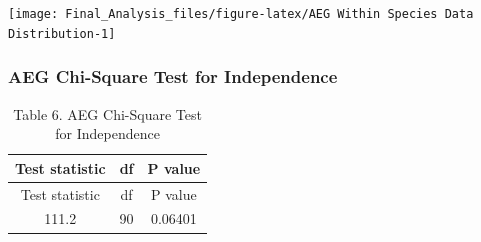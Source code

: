 \begin{center}\texttt{[image: Final\_Analysis\_files/figure-latex/AEG Within Species Data Distribution-1]} \end{center}

\subsubsection{AEG Chi-Square Test for
Independence}\label{aeg-chi-square-test-for-independence}

\begin{Shaded}
\begin{Highlighting}[]
\NormalTok{(} \NormalTok{, } \NormalTok{)}
\end{Highlighting}
\end{Shaded}

\begin{longtable}[]{@{}ccc@{}}
\caption{Table 6. AEG Chi-Square Test for Independence}\tabularnewline
\toprule
\begin{minipage}[b]{0.22\columnwidth}\centering\strut
Test statistic\strut
\end{minipage} & \begin{minipage}[b]{0.06\columnwidth}\centering\strut
df\strut
\end{minipage} & \begin{minipage}[b]{0.11\columnwidth}\centering\strut
P value\strut
\end{minipage}\tabularnewline
\midrule
\endfirsthead
\toprule
\begin{minipage}[b]{0.22\columnwidth}\centering\strut
Test statistic\strut
\end{minipage} & \begin{minipage}[b]{0.06\columnwidth}\centering\strut
df\strut
\end{minipage} & \begin{minipage}[b]{0.11\columnwidth}\centering\strut
P value\strut
\end{minipage}\tabularnewline
\midrule
\endhead
\begin{minipage}[t]{0.22\columnwidth}\centering\strut
111.2\strut
\end{minipage} & \begin{minipage}[t]{0.06\columnwidth}\centering\strut
90\strut
\end{minipage} & \begin{minipage}[t]{0.11\columnwidth}\centering\strut
0.06401\strut
\end{minipage}\tabularnewline
\bottomrule
\end{longtable}

